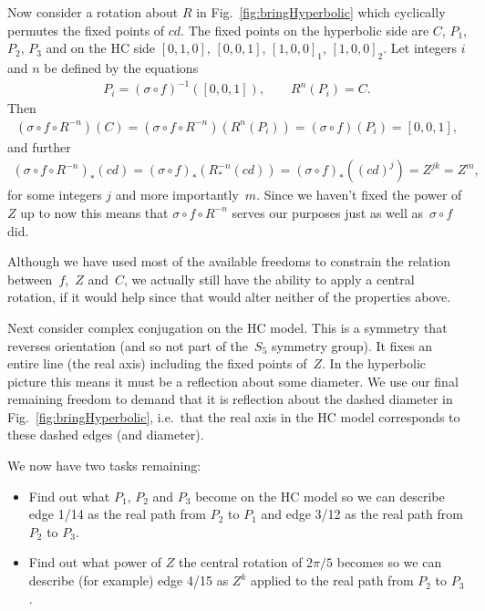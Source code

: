 \documentclass[pdftex]{sigma}
\numberwithin{equation}{section}
\begin{document}
Now consider a rotation about $R$ in Fig.~\ref{fig:bringHyperbolic} which
cyclically permutes the f\/ixed points of $cd$. The f\/ixed points
on the hyperbolic side are $C$, $P_1$, $P_2$, $P_3$ and on the HC side
$[0,1,0]$, $[0,0,1]$, $[1,0,0]_1$, $[1,0,0]_2$.  Let integers $i$ and $n$ be
def\/ined by the equations
\begin{gather*}
  P_i  = (\sigma\circ f)^{-1}([0,0,1]),  \qquad
  R^n(P_i)  = C.
\end{gather*}
Then
\begin{gather*}
  (\sigma\circ f\circ R^{-n})(C)
     = (\sigma\circ f\circ  R^{-n})(R^n(P_i))
    = (\sigma\circ f)(P_i)
    = [0,0,1],
\end{gather*}
and further
\begin{gather*}
  \left(\sigma\circ f\circ R^{-n}\right)_*(cd)
     = (\sigma\circ f)_*\left(R^{-n}_*(cd)\right)
    = (\sigma\circ f)_*\left((cd)^j\right)
    = Z^{jk}
    = Z^m,
\end{gather*}
for some integers $j$ and more importantly~$m$. Since we haven't f\/ixed
the power of $Z$ up to now this means that $\sigma\circ f\circ R^{-n}$
serves our purposes just as well as~$\sigma\circ f$ did.

Although we have used most of the available freedoms to constrain the relation bet\-ween~$f$,~$Z$ and~$C$,  we actually still have the ability to apply a central
rotation, if it would help since that would alter neither of the
properties above.

Next consider complex conjugation on the HC model. This is a symmetry that
reverses orientation (and so not part of the~$S_5$ symmetry group). It
f\/ixes an entire line (the real axis) including the f\/ixed points of~$Z$. In the hyperbolic picture this means it must be a ref\/lection
about some diameter. We use our f\/inal remaining freedom to demand that
it is ref\/lection about the dashed diameter in Fig.~\ref{fig:bringHyperbolic}, i.e.\ that the real axis in the HC model
corresponds to these dashed edges (and diameter).

We now have two tasks remaining:
\begin{itemize}\itemsep=0pt
\item Find out what $P_1$, $P_2$ and $P_3$ become on the HC model so
  we can describe edge 1/14 as the real path from $P_2$ to $P_1$ and edge
  3/12 as the real path from $P_2$ to $P_3$.
\item Find out what power of $Z$ the central rotation of $2\pi/5$
  becomes so we can describe (for example) edge 4/15 as $Z^k$ applied
  to the real path from $P_2$ to $P_3$.
\end{itemize}
\end{document}
